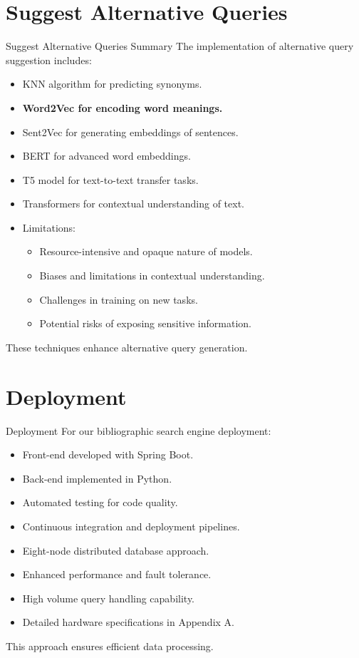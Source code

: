 \documentclass{beamer}
\begin{document}
\section{Suggest Alternative Queries}

\begin{frame}{Suggest Alternative Queries Summary}
    The implementation of alternative query suggestion includes:
    \begin{itemize}
    \item KNN algorithm for predicting synonyms.
    \item \textbf{Word2Vec for encoding word meanings.}
    \item Sent2Vec for generating embeddings of sentences.
    \item BERT for advanced word embeddings.
    \item T5 model for text-to-text transfer tasks.
    \item Transformers for contextual understanding of text.
    \item Limitations:
    \begin{itemize}
        \item Resource-intensive and opaque nature of models.
        \item Biases and limitations in contextual understanding.
        \item Challenges in training on new tasks.
        \item Potential risks of exposing sensitive information.
    \end{itemize}
    \end{itemize}
    These techniques enhance alternative query generation.
    \end{frame}
    

\section{Deployment}

\begin{frame}{Deployment}
    For our bibliographic search engine deployment:
    \begin{itemize}
    \item Front-end developed with Spring Boot.
    \item Back-end implemented in Python.
    \item Automated testing for code quality.
    \item Continuous integration and deployment pipelines.
    \item Eight-node distributed database approach.
    \item Enhanced performance and fault tolerance.
    \item High volume query handling capability.
    \item Detailed hardware specifications in Appendix A.
    \end{itemize}
    This approach ensures efficient data processing.
\end{frame}
    
\end{document}
